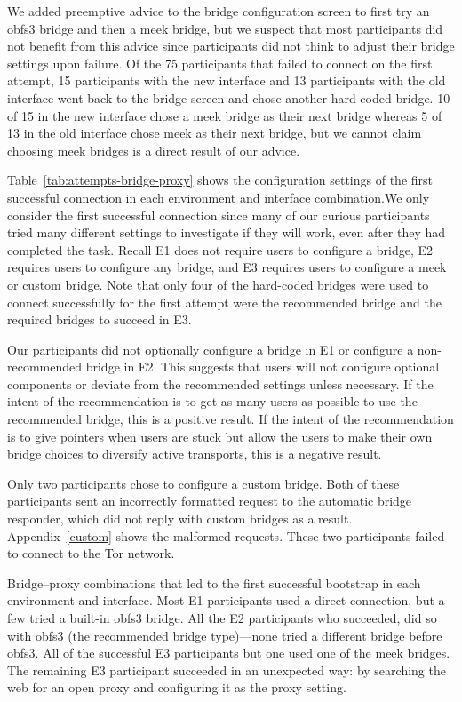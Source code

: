 \documentclass[USenglish,oneside,twocolumn]{article}
\begin{document}
We added preemptive advice to the bridge configuration screen to first try an obfs3 bridge and then a meek bridge, but we suspect that most participants did not benefit from this advice since participants did not think to adjust their bridge settings upon failure. Of the 75 participants that failed to connect on the first attempt, 15 participants with the new interface and 13 participants with the old interface went back to the bridge screen and chose another hard-coded bridge. 10 of 15 in the new interface chose a meek bridge as their next bridge whereas 5 of 13 in the old interface chose meek as their next bridge, but we cannot claim choosing meek bridges is a direct result of our advice.

Table~\ref{tab:attempts-bridge-proxy} shows the configuration settings of the first successful connection in each environment and interface combination.We only consider the first successful connection since many of our curious participants tried many different settings to investigate if they will work, even after they had completed the task. Recall E1 does not require users to configure a bridge, E2 requires users to configure any bridge, and E3 requires users to configure a meek or custom bridge. Note that only four of the hard-coded bridges were used to connect successfully for the first attempt were the recommended bridge and the required bridges to succeed in E3.

Our participants did not optionally configure a bridge in E1 or configure a non-recommended bridge in E2. This suggests that users will not configure optional components or deviate from the recommended settings unless necessary. If the intent of the recommendation is to get as many users as possible to use the recommended bridge, this is a positive result. If the intent of the recommendation is to give pointers when users are stuck but allow the users to make their own bridge choices to diversify active transports, this is a negative result. 

Only two participants chose to configure a custom bridge. Both of these participants sent an incorrectly formatted request to the automatic bridge responder, which did not reply with custom bridges as a result. Appendix~\ref{custom} shows the malformed requests. These two participants failed to connect to the Tor network. 

\begin{table}
\centering

\caption{
Bridge--proxy combinations that led to the first successful bootstrap
in each environment and interface.
Most E1 participants used a direct connection,
but a few tried a built-in obfs3 bridge.
All the E2 participants who succeeded,
did so with obfs3 (the recommended bridge type)---none tried
a different bridge before obfs3.
All of the successful E3 participants but one
used one of the meek bridges.
The remaining E3 participant succeeded in an unexpected way:
by searching the web for an open proxy and configuring it
as the proxy setting.
}
\label{tab:attempts-bridge-proxy}
\end{table}
\end{document}
